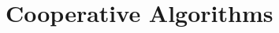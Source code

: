 \documentclass{ifacconf}
\newcommand{\squeezeup}{\vspace{-2.0mm}}
\begin{document}
%
%

\section{Cooperative Algorithms}
\label{sec:CoopAlgs}
\squeezeup
\end{document}
